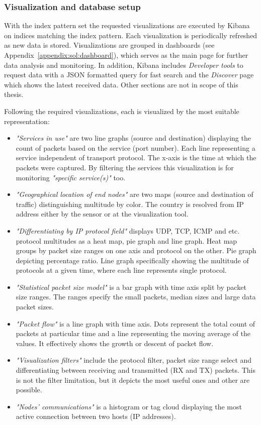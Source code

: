\documentclass[12pt,a4paper,twoside]{report}
\begin{document}
			\subsubsection*{Visualization and database setup} \label{sol:design:elk:vis}
				With the index pattern set the requested visualizations are executed by Kibana on indices matching the index pattern. Each  visualization is periodically refreshed as new data is stored. Visualizations are grouped in dashboards (see Appendix~\ref{appendix:sol:dashboard}), which serves as the main page for further data analysis and monitoring. In addition, Kibana includes \emph{Developer tools} to request data with a JSON formatted query for fast search and the \emph{Discover} page which shows the latest received data. Other sections are not in scope of this thesis.\par
				Following the required visualizations, each is visualized by the most suitable representation:
				\begin{itemize}
					\item \emph{"Services in use"} are two line graphs (source and destination) displaying the count of packets based on the service (port number). Each line representing a service independent of transport protocol. The x-axis is the time at which the packets were captured. By filtering the services this visualization is for monitoring \emph{"specific service(s)"} too.
					\item \emph{"Geographical location of end nodes"} are two maps (source and destination of traffic) distinguishing multitude by color. The country is resolved from IP address either by the sensor or at the visualization tool.
					\item \emph{"Differentiating by IP protocol field"} displays UDP, TCP, ICMP and etc. protocol multitudes as a heat map, pie graph and line graph. Heat map groups by packet size ranges on one axis and protocol on the other. Pie graph depicting percentage ratio. Line graph specifically showing the multitude of protocols at a given time, where each line represents single protocol.
					\item \emph{"Statistical packet size model"} is a bar graph with time axis split by packet size ranges. The ranges specify the small packets, median sizes and large data packet sizes.
					\item \emph{"Packet flow"} is a line graph with time axis. Dots represent the total count of packets at particular time and a line representing the moving average of the values. It effectively shows the growth or descent of packet flow.
					\item \emph{"Visualization filters"} include the protocol filter, packet size range select and differentiating between receiving and transmitted (RX and TX) packets. This is not the filter limitation, but it depicts the most useful ones and other are possible.
					\item \emph{"Nodes' communications"} is a histogram or tag cloud displaying the most active connection between two hosts (IP addresses). 
				\end{itemize}
				
\end{document}
